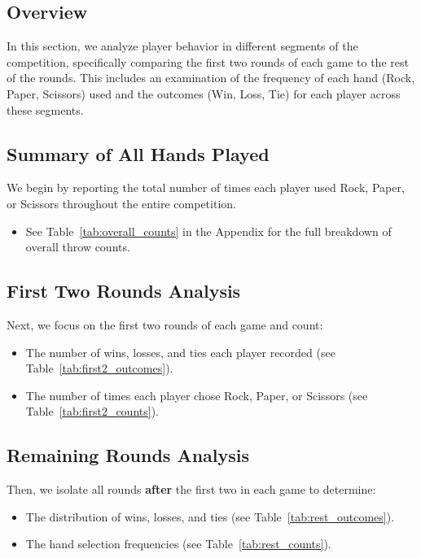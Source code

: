 \documentclass[12pt]{article}
\begin{document}
\subsection*{Overview}
In this section, we analyze player behavior in different segments of the competition, specifically comparing the first two rounds of each game to the rest of the rounds. This includes an examination of the frequency of each hand (Rock, Paper, Scissors) used and the outcomes (Win, Loss, Tie) for each player across these segments.

\subsection*{Summary of All Hands Played}
We begin by reporting the total number of times each player used Rock, Paper, or Scissors throughout the entire competition.

\begin{itemize}
    \item See Table~\ref{tab:overall_counts} in the Appendix for the full breakdown of overall throw counts.
\end{itemize}

\subsection*{First Two Rounds Analysis}
Next, we focus on the first two rounds of each game and count:

\begin{itemize}
    \item The number of wins, losses, and ties each player recorded (see Table~\ref{tab:first2_outcomes}).
    \item The number of times each player chose Rock, Paper, or Scissors (see Table~\ref{tab:first2_counts}).
\end{itemize}

\subsection*{Remaining Rounds Analysis}
Then, we isolate all rounds \textbf{after} the first two in each game to determine:

\begin{itemize}
    \item The distribution of wins, losses, and ties (see Table~\ref{tab:rest_outcomes}).
    \item The hand selection frequencies (see Table~\ref{tab:rest_counts}).
\end{itemize}
\end{document}
